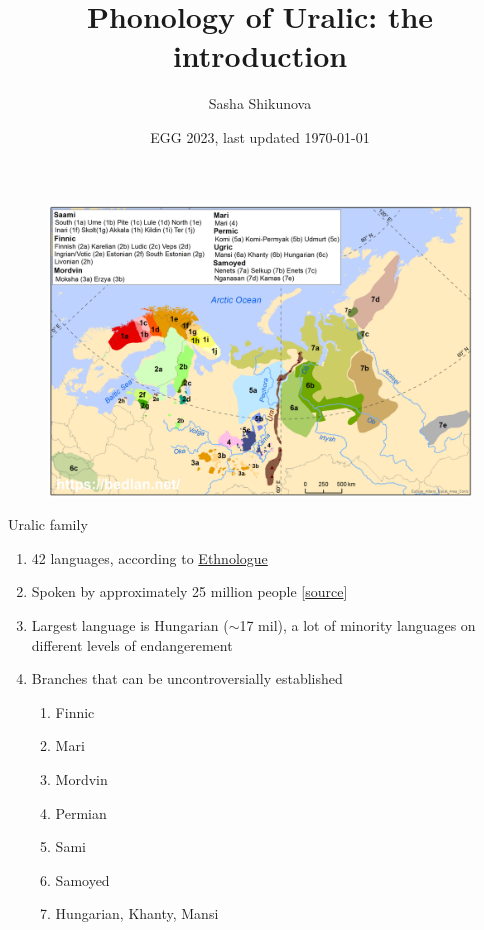 \documentclass[10 pt, handout]{beamer}
\title{Phonology of Uralic: the introduction}
\author{Sasha Shikunova}
\institute{HSE University (Moscow)}
\date{EGG 2023, last updated \today}
\begin{document}
\begin{frame}
\titlepage
\end{frame}
		
\begin{frame}{}

	\begin{figure}[H]
		\centering
		\includegraphics[scale=.15]{uralic-map}
	\end{figure}

\end{frame}

\begin{frame}{Uralic family}

	\begin{enumerate}[$\gg$]
		\item 42 languages, according to \href{https://www.ethnologue.com/subgroup/1083/}{Ethnologue}
		\item Spoken by approximately 25 million people [\href{https://www.britannica.com/topic/Uralic-languages}{source}]
		\item Largest language is Hungarian ($\sim$17 mil), a lot of minority languages on different levels of endangerement
		\item Branches that can be uncontroversially established \parencite{salminen2002}
			\begin{enumerate}[$\cdot$]
			\normalsize
			\setlength\itemsep{0em}
				\item Finnic
				\item Mari
				\item Mordvin
				\item Permian
				\item Sami
				\item Samoyed
				\item Hungarian, Khanty, Mansi
			\end{enumerate}
	\end{enumerate}

\end{frame}
\end{document}
